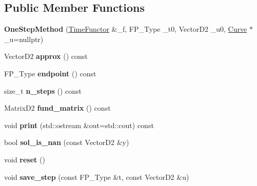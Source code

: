 \subsection*{Public Member Functions}
\begin{DoxyCompactItemize}
\item 
\mbox{\label{classOneStepMethod_af80b8284dc4c01633056d626e96dcce2}} 
{\bfseries One\+Step\+Method} (\hyperlink{classTimeFunctor}{Time\+Functor} \&\+\_\+f, F\+P\+\_\+\+Type \+\_\+t0, Vector\+D2 \+\_\+u0, \hyperlink{classCurve}{Curve} $\ast$\+\_\+u=nullptr)
\item 
\mbox{\label{classOneStepMethod_a5f4529edf5aae96d1dd0061b7a798e4f}} 
Vector\+D2 {\bfseries approx} () const
\item 
\mbox{\label{classOneStepMethod_a5fa1efcb274907b97f31cfbbb0c5dc07}} 
F\+P\+\_\+\+Type {\bfseries endpoint} () const
\item 
\mbox{\label{classOneStepMethod_a7ae5bcaf0c1e48551456a6f0835414d2}} 
size\+\_\+t {\bfseries n\+\_\+steps} () const
\item 
\mbox{\label{classOneStepMethod_ad59a0fce9906ba9159da74aea44b3431}} 
Matrix\+D2 {\bfseries fund\+\_\+matrix} () const
\item 
\mbox{\label{classOneStepMethod_aa3fc1d095086c736ef23c60e56034474}} 
void {\bfseries print} (std\+::ostream \&out=std\+::cout) const
\item 
\mbox{\label{classOneStepMethod_ad5e6154e9cc700056474c1c6128e3e9f}} 
bool {\bfseries sol\+\_\+is\+\_\+nan} (const Vector\+D2 \&y)
\item 
\mbox{\label{classOneStepMethod_a4e6743b0343a6c5bb75e423649915b86}} 
void {\bfseries reset} ()
\item 
\mbox{\label{classOneStepMethod_a511d73f8ac7ba27a4e0289b70be7ffad}} 
void {\bfseries save\+\_\+step} (const F\+P\+\_\+\+Type \&t, const Vector\+D2 \&u)
\item 
\mbox{\label{classOneStepMethod_ab188f8163d0c424a678f8151c6330439}} 

\end{DoxyCompactItemize}
